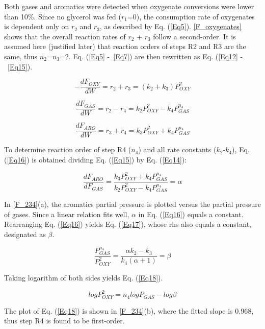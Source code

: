 \documentclass[journal=iecred,manuscript=article]{achemso}
\begin{document}
Both gases and aromatics were detected when oxygenate conversions were lower than 10\%.
Since no glycerol was fed ($r_1$=0), the consumption rate of oxygenates is dependent only on $r_2$ and $r_3$,
as described by Eq. (\ref{Eq5}).
\ref{F_oxygenates} shows that the overall reaction rates of $r_2$ + $r_3$ follow a second-order.
It is assumed here (justified later) that reaction orders of steps R2 and R3 are the same, thus $n_2$=$n_3$=2.
Eq. (\ref{Eq5} -~\ref{Eq7}) are then rewritten as Eq. (\ref{Eq12} -~\ref{Eq15}).

\begin{equation} \label{Eq12}
-\frac{dF_{OXY}}{dW}=r_2+r_3=(k_2+k_3)P_{OXY}^2
\end{equation}

\begin{equation} \label{Eq14}
\frac{dF_{GAS}}{dW}=r_2-r_4=k_2P_{OXY}^2-k_4P_{GAS}^{n_4}
\end{equation}

\begin{equation} \label{Eq15}
\frac{dF_{ARO}}{dW}=r_3+r_4=k_3P_{OXY}^2+k_4P_{GAS}^{n_4}
\end{equation}

To determine reaction order of step R4 ($n_4$) and all rate constants ($k_2$-$k_4$), 
Eq. (\ref{Eq16}) is obtained dividing Eq. (\ref{Eq15}) by Eq. (\ref{Eq14}):


\begin{equation} \label{Eq16}
\frac{dF_{ARO}}{dF_{GAS}}=\frac{k_3 P_{OXY}^2+k_4 P_{GAS}^{n_4}}{k_2 P_{OXY}^2-k_4 P_{GAS}^{n_4}}=\alpha
\end{equation}
 
In \ref{F_234}(a),
the aromatics partial pressure is plotted versus the partial pressure of gases.
Since a linear relation fits well, $\alpha$ in Eq. (\ref{Eq16}) equals a constant.
Rearranging Eq. (\ref{Eq16}) yields Eq. (\ref{Eq17}), whose rhs also equals a constant, designated as $\beta$.

\begin{equation} \label{Eq17}
\frac{P_{GAS}^{n_4}}{P_{OXY}^2}=\frac{\alpha k_2 - k_3}{k_4(\alpha + 1)}=\beta
\end{equation}

Taking logarithm of both sides yields Eq. (\ref{Eq18}).

\begin{equation} \label{Eq18}
logP_{OXY}^2=n_4logP_{GAS}-log\beta
\end{equation}

The plot of Eq. (\ref{Eq18}) is shown in \ref{F_234}(b),
where the fitted slope is 0.968, thus step R4 is found to be first-order.
\end{document}
